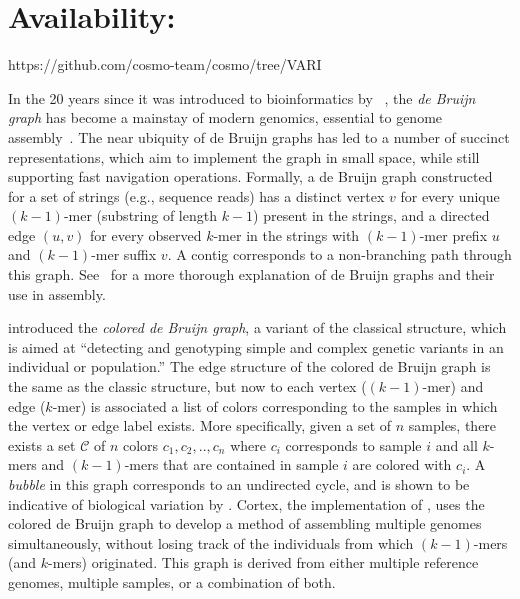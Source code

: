 \documentclass[doctor]{thesis}
\begin{document}
\section{Availability:} https://github.com/cosmo-team/cosmo/tree/VARI
 
\makeatletter{}

In the 20 years since it was introduced to bioinformatics by ~\cite{IW95}, the {\em de Bruijn graph} has become a mainstay of modern genomics, essential to genome assembly~\citep{how,sequel,ismb2015}. The near ubiquity of de Bruijn graphs has led to a number of succinct representations, which aim to implement the graph in small space, while still supporting fast navigation operations.  Formally, a de Bruijn graph constructed for a set of strings (e.g., sequence reads) has a distinct vertex $v$ for every unique $(k - 1)$-mer (substring of length $k - 1$) present in the strings, and a directed edge $(u, v)$ for every observed $k$-mer in the strings with $(k - 1)$-mer prefix $u$ and $(k - 1)$-mer suffix $v$. A contig corresponds to a non-branching path through this graph. See~\citep{how} for a more thorough explanation of de Bruijn graphs and their use in assembly. 

\cite{ICTFM12} introduced the {\em colored de Bruijn graph}, a variant of the classical structure, which is aimed at ``detecting and genotyping simple and complex genetic variants in an individual or population.'' The edge structure of the colored de Bruijn graph is the same as the classic structure, but now to each vertex ($(k - 1)$-mer) and edge ($k$-mer)
is associated a list of colors corresponding to the samples in which the vertex or edge label exists. More specifically, given a set of $n$ samples, there exists a set $\mathcal{C}$ of $n$ colors $c_1, c_2, .., c_n$ where $c_i$ corresponds to sample $i$ and all $k$-mers and $(k-1)$-mers that are contained in sample $i$ are colored with $c_i$. A {\em bubble} in this graph corresponds to an undirected cycle, and is shown to be indicative of biological variation by \cite{ICTFM12}. 
{\sc Cortex}, the implementation of \cite{ICTFM12}, uses the colored de Bruijn graph to develop a method of assembling multiple genomes simultaneously, without losing track of the individuals from which $(k - 1)$-mers (and $k$-mers) originated. This graph is derived from either multiple reference genomes, multiple samples, or a combination of both.
\end{document}
